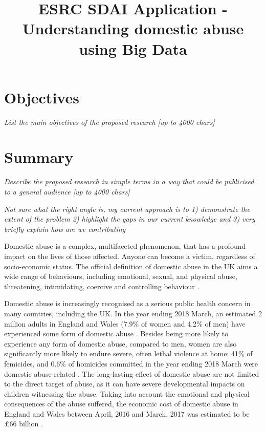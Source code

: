 \documentclass[11pt, a4paper]{article}
\begin{document}
\title{ESRC SDAI Application - Understanding domestic abuse using Big Data}
\date{}
\maketitle
\section{Objectives}
\textit{List the main objectives of the proposed research [up to 4000 chars]}
\section{Summary}

\textit{Describe the proposed research in simple terms in a way that could be publicised to a general audience [up to 4000 chars]}

\textit{Not sure what the right angle is, my current approach is to 1) demonstrate the extent of the problem 2) highlight the gaps in our current knowledge and 3) very briefly explain how are we contributing}

Domestic abuse is a complex, multifaceted phenomenon, that has a profound impact on the lives of those affected. Anyone can become a victim, regardless of socio-economic status. The official definition of domestic abuse in the UK aims a wide range of behaviours, including emotional, sexual, and physical abuse, threatening, intimidating, coercive and controlling behaviour \cite{govuk}. 


Domestic abuse is increasingly recognised as a serious public health concern in many countries, including the UK. In the year ending 2018 March, an estimated 2 million adults in England and Wales (7.9\% of women and 4.2\% of men) have experienced some form of domestic abuse \cite{ONS}. Besides being more likely to experience any form of domestic abuse, compared to men, women are also significantly more likely to endure severe, often lethal violence at home: 41\% of femicides, and 0.6\% of homicides committed in the year ending 2018 March were domestic abuse-related \cite{homic}. The long-lasting effect of domestic abuse are not limited to the direct target of abuse, as it can have severe developmental impacts on children witnessing the abuse. Taking into account the emotional and physical consequences of the abuse suffered, the economic cost of domestic abuse in England and Wales between April, 2016 and March, 2017 was estimated to be \pounds 66 billion \cite{costs}. 
\end{document}
